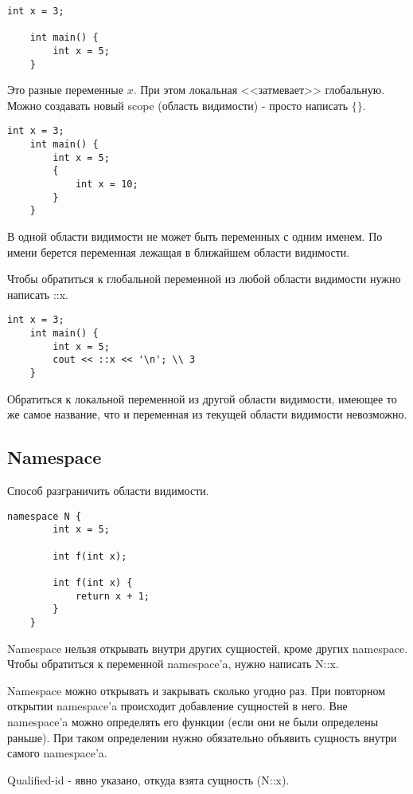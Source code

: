 \begin{Verbatim}[tabsize=4]
	int x = 3;
	
	int main() {
		int x = 5;
	}
\end{Verbatim}

Это разные переменные $x$. При этом локальная <<затмевает>> глобальную. Можно создавать новый scope (область видимости) - просто написать $\{\}$.

\begin{Verbatim}[tabsize=4]
	int x = 3;
	int main() {
		int x = 5;
		{
			int x = 10;
		}
	}
\end{Verbatim}

В одной области видимости не может быть переменных с одним именем. По имени берется переменная лежащая в ближайшем области видимости.

Чтобы обратиться к глобальной переменной из любой области видимости нужно написать ::x.

\begin{Verbatim}[tabsize=4]
	int x = 3;
	int main() {
		int x = 5;
		cout << ::x << '\n'; \\ 3
	}
\end{Verbatim}

Обратиться к локальной переменной из другой области видимости, имеющее то же самое название, что и переменная из текущей области видимости невозможно.


\subsection{Namespace}
Способ разграничить области видимости.

\begin{Verbatim}[tabsize=4]
	namespace N {
		int x = 5;
		
		int f(int x);
		
		int f(int x) {
			return x + 1;
		}
	}
\end{Verbatim}

Namespace нельзя открывать внутри других сущностей, кроме других namespace. Чтобы обратиться к переменной namespace'a, нужно написать N::x.

Namespace можно открывать и закрывать сколько угодно раз. При повторном открытии namespace'a происходит добавление сущностей в него. Вне namespace'a можно определять его функции (если они не были определены раньше). При таком определении нужно обязательно объявить сущность внутри самого namespace'a.

Qualified-id - явно указано, откуда взята сущность (N::x).

